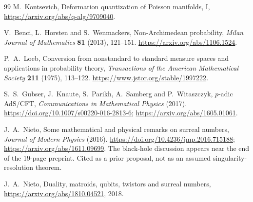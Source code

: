 \documentclass[11pt,letterpaper]{article}
\numberwithin{equation}{section}
\theoremstyle{definition}
\theoremstyle{remark}
\begin{document}
\begin{thebibliography}{99}
M.~Kontsevich, Deformation quantization of Poisson manifolds, I,
\url{https://arxiv.org/abs/q-alg/9709040}.

V.~Benci, L.~Horsten and S.~Wenmackers, Non-Archimedean probability,
\emph{Milan Journal of Mathematics} \textbf{81} (2013), 121--151.
\url{https://arxiv.org/abs/1106.1524}.

P.~A.~Loeb, Conversion from nonstandard to standard measure spaces and
applications in probability theory, \emph{Transactions of the American
Mathematical Society} \textbf{211} (1975), 113--122.
\url{https://www.jstor.org/stable/1997222}.

S.~S.~Gubser, J.~Knaute, S.~Parikh, A.~Samberg and P.~Witaszczyk, $p$-adic
AdS/CFT, \emph{Communications in Mathematical Physics} (2017).
\url{https://doi.org/10.1007/s00220-016-2813-6};
\url{https://arxiv.org/abs/1605.01061}.

J.~A.~Nieto, Some mathematical and physical remarks on surreal numbers,
\emph{Journal of Modern Physics} (2016).
\url{https://doi.org/10.4236/jmp.2016.715188};
\url{https://arxiv.org/abs/1611.09699}. The black-hole discussion appears near
the end of the 19-page preprint. Cited as a prior proposal, not as an assumed
singularity-resolution theorem.

J.~A.~Nieto, Duality, matroids, qubits, twistors and surreal numbers,
\url{https://arxiv.org/abs/1810.04521}, 2018.

\end{thebibliography}
\endgroup
\end{document}
